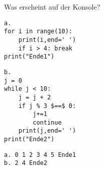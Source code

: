 \question[4] Was erscheint auf der Konsole? \\
\begin{minipage}[c]{6cm}
\begin{lstlisting}
a.
for i in range(10):
    print(i,end=' ')
    if i > 4: break
print("Ende1")
\end{lstlisting}
\end{minipage}
\begin{minipage}[c]{6cm}
\begin{lstlisting}
b.
j = 0
while j < 10:
    j = j + 2
    if j % 3 $==$ 0:
        j+=1
        continue
    print(j,end=' ')
print("Ende2")
\end{lstlisting}
\end{minipage}
\begin{solutionbox}{2cm}
\begin{lstlisting}
a. 0 1 2 3 4 5 Ende1
b. 2 4 Ende2
\end{lstlisting}
\end{solutionbox}
